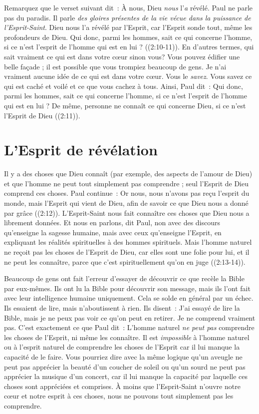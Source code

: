 Remarquez que le verset suivant dit~:
 \og À nous, Dieu \emph{nous} l'\emph{a} révélé. \fg{}
 Paul ne parle pas du paradis.
 Il parle \emph{des gloires présentes de la vie vécue dans la puissance
 de l'Esprit-Saint}.
 \og Dieu nous l'a révélé par l'Esprit, car l'Esprit sonde tout,
 même les profondeurs de Dieu. Qui donc, parmi les hommes,
 sait ce qui concerne l'homme, si ce n'est l'esprit de l'homme
 qui est en lui ? \fg{} ((2:10-11)).
 En d'autres termes, qui sait vraiment ce qui est dans votre cœur sinon vous?
 Vous pouvez édifier une belle façade ; il est possible que vous trompiez
 beaucoup de gens.
 Je n'ai vraiment aucune idée de ce qui est dans votre cœur.
 Vous le \emph{savez}.
 Vous savez ce qui est caché et voilé et ce que vous cachez à tous.
 Ainsi, Paul dit~:
 \og Qui donc, parmi les hommes, sait ce qui concerne l'homme,
 si ce n'est l'esprit de l'homme qui est en lui ?
 De même, personne ne connaît ce qui concerne Dieu,
 si ce n'est l'Esprit de Dieu \fg{} ((2:11)).


\section{L'Esprit de r\'ev\'elation}

Il y a des choses que Dieu connaît
 (par exemple, des aspects de l'amour de Dieu)
 et que l'homme ne peut tout simplement pas comprendre ;
 seul l'Esprit de Dieu comprend ces choses. Paul continue~:
 \og Or nous, nous n'avons pas reçu l'esprit du monde,
 mais l'Esprit qui vient de Dieu, afin de savoir ce que Dieu
 nous a donné par grâce \fg{} ((2:12)).
 L'Esprit-Saint nous fait connaître ces choses que Dieu
 nous a librement données.
 \og Et nous en parlons, dit Paul, non avec des discours qu'enseigne
 la sagesse humaine, mais avec ceux qu'enseigne l'Esprit,
 en expliquant les réalités spirituelles à des hommes spirituels.
 Mais l'homme naturel ne reçoit pas les choses de l'Esprit de Dieu,
 car elles sont une folie pour lui, et il ne peut les connaître,
 parce que c'est spirituellement qu'on en juge \fg{}
 ((2:13-14)).

Beaucoup de gens ont fait l'erreur d'essayer de découvrir ce que recèle
 la Bible par eux-mêmes. Ils ont lu la Bible pour découvrir son message,
 mais ils l'ont fait avec leur intelligence humaine uniquement.
 Cela se solde en général par un échec. Ils essaient de lire,
 mais n'aboutissent à rien. Ils disent~:
 \og J'ai essayé de lire la Bible, mais je ne peux pas voir ce qu'on peut
 en retirer. Je ne comprend vraiment pas. \fg{}
 C'est exactement ce que Paul dit~:
 \og L'homme naturel \emph{ne peut pas} comprendre les choses de l'Esprit,
 ni même les connaître. \fg{}
 Il est \emph{impossible} à l'homme naturel ou à l'esprit naturel
 de comprendre les choses de l'Esprit car il lui manque la capacité
 de le faire. Vous pourriez dire avec la même logique qu'un aveugle
 ne peut pas apprécier la beauté d'un coucher de soleil ou qu'un sourd
 ne peut pas apprécier la musique d'un concert, car il lui manque la capacité
 par laquelle ces choses sont appréciées et comprises.
 À moins que l'Esprit-Saint n'ouvre notre cœur et notre esprit à ces choses,
 nous ne pouvons tout simplement pas les comprendre.



